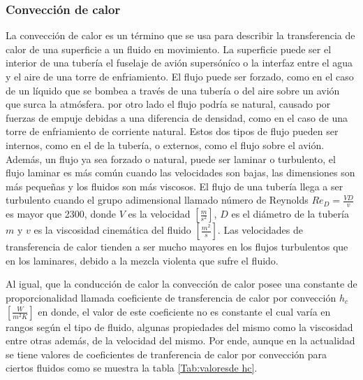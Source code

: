 \documentclass[12pt,letterpaper]{article}     %
\begin{document}
 
 
 
 




\subsubsection{Convección de calor}
\cite[p\ 18]{Mills} La convección de calor es un término que se usa para describir la transferencia de calor de una superficie a un fluido en movimiento. La superficie puede ser el interior de una tubería el fuselaje de avión supersóníco o la interfaz entre el agua y el aire de una torre de enfriamiento. El flujo puede ser forzado, como en el caso de un líquido que se bombea a través de una tubería o del aire sobre un avión que surca la atmósfera. por otro lado el flujo podría se natural, causado por fuerzas de empuje 
debidas a una diferencia de densidad, como en el caso de una torre de enfriamiento de corriente natural.
Estos dos tipos de flujo pueden ser internos, como en el de la tubería, o externos, como el flujo sobre el avión. Además, un flujo ya sea forzado o natural, puede ser laminar o turbulento, el flujo laminar es más común cuando las velocidades son bajas, las dimensiones son más pequeñas y los fluidos son más viscosos. El flujo de una tubería llega a ser turbulento cuando el grupo adimensional llamado número de Reynolds $Re_{D} = \frac{VD}{v}$ es mayor que 2300, donde $V$ es la velocidad $[\frac{m}{s^2}]$, $D$ es el diámetro de la tubería $m$ y $v$ es la viscosidad cinemática del fluido $[\frac{m^2}{s}]$. Las velocidades de transferencia de calor tienden a ser mucho mayores en los flujos turbulentos que en los laminares, debido a la mezcla violenta que sufre el fluido.

Al igual, que la conducción de calor la convección de calor posee una constante de proporcionalidad llamada coeficiente de transferencia de calor por convección $h_{c}$ $[\frac{W}{m^2K}]$ en donde, el valor de este coeficiente no es constante el cual varía en rangos según el tipo de fluido, algunas propiedades del mismo como la viscosidad entre otras además, de la velocidad del mismo. Por ende, aunque en la actualidad se tiene valores de coeficientes de tranferencia de calor por convección para ciertos fluidos como se muestra la tabla \ref{Tab:valoresde hc}.
\end{document}
